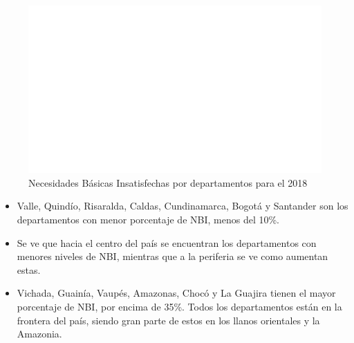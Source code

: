    \begin{figure}[H]
        \caption{Necesidades Básicas Insatisfechas por departamentos para el 2018 \label{map_result_2} }
        \begin{center}
        \includegraphics[width=\textwidth,keepaspectratio]{img/var_273_map.png}
        \end{center}
    \end{figure}
            \begin{itemize}
                    \item Valle, Quindío, Risaralda, Caldas, Cundinamarca, Bogotá y Santander son los departamentos con menor porcentaje de NBI, menos del 10\%.
                    \item Se ve que hacia el centro del país se encuentran los departamentos con menores niveles de NBI, mientras que a la periferia se ve como aumentan estas.
                    \item Vichada, Guainía, Vaupés, Amazonas, Chocó y La Guajira tienen el mayor porcentaje de NBI, por encima de 35\%. Todos los departamentos están en la frontera del país, siendo gran parte de estos en los llanos orientales y la Amazonia.
                    \end{itemize}

